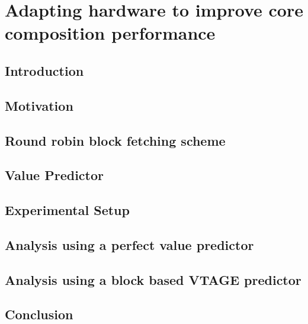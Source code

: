 \chapter{Adapting hardware to improve core composition performance}

\section{Introduction}\label{sect:introduction-chapter3}

\section{Motivation}\label{sect:ch3-motivation}

\section{Round robin block fetching scheme}\label{chp3:sec:fetch}

\section{Value Predictor}

\section{Experimental Setup}
\label{chp:chp3:sec:exp}
\section{Analysis using a perfect value predictor}
\label{chp:chp3:sec:analysis}
\section{Analysis using a block based VTAGE predictor}
\label{chp:chp3:sec:analysis}
\section{Conclusion}

%
%